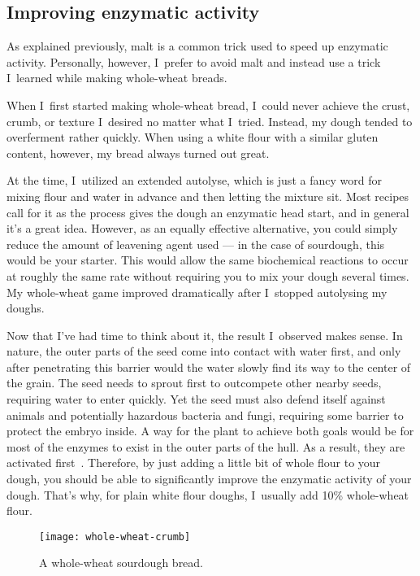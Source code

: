 \subsection{Improving enzymatic activity}

As explained previously, malt is a common trick used to speed up enzymatic
activity. Personally, however, I~prefer to avoid malt and instead use a
trick I~learned while making whole-wheat breads.

When I~first started making whole-wheat bread, I~could never achieve the
crust, crumb, or texture I~desired no matter what I~tried. Instead, my dough
tended to overferment rather quickly. When using a white flour with a similar
gluten content, however, my bread always turned out great.

At the time, I~utilized an extended autolyse, which is just a fancy word for
mixing flour and water in advance and then letting the mixture sit. Most
recipes call for it as the process gives the dough an enzymatic head start, and
in general it's a great idea. However, as an equally effective alternative,
you could simply reduce the amount of leavening agent used --- in the case of
sourdough, this would be your starter. This would allow the same biochemical
reactions to occur at roughly the same rate without requiring you to mix your
dough several times. My whole-wheat game improved dramatically after I~stopped
autolysing my doughs.

Now that I've had time to think about it, the result I~observed makes sense.
In nature, the outer parts of the seed come into contact with water first, and
only after penetrating this barrier would the water slowly find its way to the
center of the grain. The seed needs to sprout first to outcompete other nearby
seeds, requiring water to enter quickly. Yet the seed must also defend itself
against animals and potentially hazardous bacteria and fungi, requiring some
barrier to protect the embryo inside. A way for the plant to achieve both goals
would be for most of the enzymes to exist in the outer parts of the hull. As a
result, they are activated first~\cite{enzymatic+activity+whole+wheat}. Therefore, by just adding a
little bit of whole flour to your dough, you should be able to significantly
improve the enzymatic activity of your dough. That's why, for plain white flour
doughs, I~usually add 10\% whole-wheat flour.

\begin{figure}
  \texttt{[image: whole-wheat-crumb]}
  \caption{A whole-wheat sourdough bread.}%
  \label{whole-wheat-crumb}
\end{figure}

